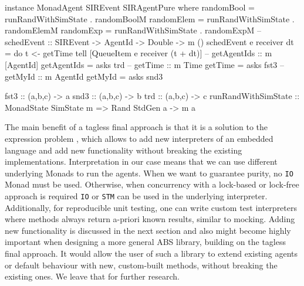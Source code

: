 \begin{HaskellCode}   
instance MonadAgent SIREvent SIRAgentPure where
  randomBool = runRandWithSimState . randomBoolM
  randomElem = runRandWithSimState . randomElemM
  randomExp  = runRandWithSimState . randomExpM
  -- schedEvent :: SIREvent -> AgentId -> Double -> m ()
  schedEvent e receiver dt = do
    t <- getTime 
    tell [QueueItem e receiver (t + dt)]
  -- getAgentIds :: m [AgentId]
  getAgentIds = asks trd
  -- getTime :: m Time
  getTime = asks fst3
  -- getMyId :: m AgentId
  getMyId = asks snd3

fst3 :: (a,b,c) -> a
snd3 :: (a,b,c) -> b
trd :: (a,b,c) -> c
runRandWithSimState :: MonadState SimState m => Rand StdGen a -> m a
\end{HaskellCode}

The main benefit of a tagless final approach is that it is a solution to the expression problem \cite{kiselyov_typed_2012}, which allows to add new interpreters of an embedded language and add new functionality without breaking the existing implementations. Interpretation in our case means that we can use different underlying Monads to run the agents. When we want to guarantee purity, no \texttt{IO} Monad must be used. Otherwise, when concurrency with a lock-based or lock-free approach is required \texttt{IO} or \texttt{STM} can be used in the underlying interpreter. Additionally, for reproducible unit testing, one can write custom test interpreters where methods always return a-priori known results, similar to mocking. Adding new functionality is discussed in the next section and also might become highly important when designing a more general ABS library, building on the tagless final approach. It would allow the user of such a library to extend existing agents or default behaviour with new, custom-built methods, without breaking the existing ones. We leave that for further research.